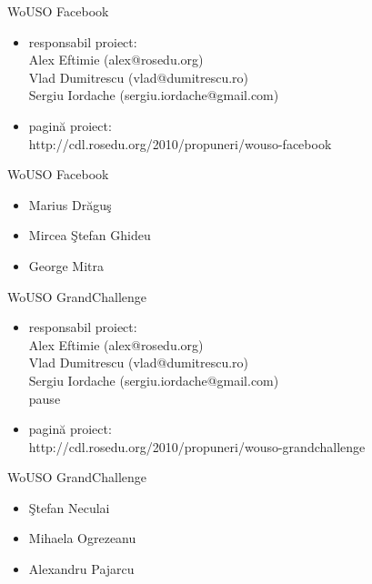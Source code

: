 \documentclass{beamer}
\begin{document}
\begin{frame}{WoUSO Facebook}
  \begin{itemize} %
  \pause
  \item responsabil proiect: \\ Alex Eftimie (alex@rosedu.org) \\ Vlad Dumitrescu (vlad@dumitrescu.ro) \\ Sergiu Iordache (sergiu.iordache@gmail.com) 
  \pause
  \item pagină proiect: \\ http://cdl.rosedu.org/2010/propuneri/wouso-facebook
  \end{itemize}
\end{frame}

\begin{frame}{WoUSO Facebook}
  \begin{itemize} %
  \pause
  \item Marius Drăguş
  \pause
  \item Mircea Ştefan Ghideu
  \pause
  \item George Mitra
  \end{itemize}
\end{frame}

\begin{frame}{WoUSO GrandChallenge}
  \begin{itemize} %
  \pause
  \item responsabil proiect: \\ Alex Eftimie (alex@rosedu.org) \\ Vlad Dumitrescu (vlad@dumitrescu.ro) \\ Sergiu Iordache (sergiu.iordache@gmail.com) \\ pause
  \item pagină proiect: \\ http://cdl.rosedu.org/2010/propuneri/wouso-grandchallenge
  \end{itemize}
\end{frame}

\begin{frame}{WoUSO GrandChallenge}
  \begin{itemize} %
  \pause
  \item Ştefan Neculai
  \pause
  \item Mihaela Ogrezeanu
  \pause
  \item Alexandru Pajarcu
  \end{itemize}
\end{frame}
\end{document}
